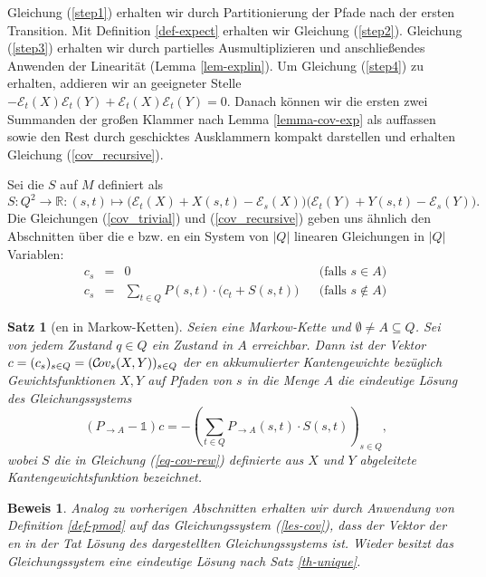 \documentclass[a4paper]{article}
\newcommand{\mc}{Markow-Kette}
\newtheorem{satz}{Satz}[section] %
\theoremstyle{nonumberplain}
\newtheorem{beweis}{Beweis}
\begin{document}
Gleichung (\ref{step1}) erhalten wir durch Partitionierung der Pfade nach der ersten Transition.
Mit Definition \ref{def-expect} erhalten wir Gleichung (\ref{step2}).
Gleichung (\ref{step3}) erhalten wir durch partielles Ausmultiplizieren und anschließendes Anwenden der Linearität (Lemma \ref{lem-explin}). Um Gleichung (\ref{step4}) zu erhalten, addieren wir an geeigneter Stelle $- \mathcal{E}_{t}(X)\mathcal{E}_{t}(Y) + \mathcal{E}_{t}(X)\mathcal{E}_{t}(Y) = 0$. Danach können wir die ersten zwei Summanden der großen Klammer nach Lemma \ref{lemma-cov-exp} als \cov{} auffassen sowie den Rest durch geschicktes Ausklammern kompakt darstellen und erhalten Gleichung (\ref{cov_recursive}).

Sei die \reward{} $S$ auf $M$ definiert als
\begin{equation}
S: Q^2 \to \mathbb{R} : (s,t) \mapsto \big(\mathcal{E}_{t}(X) + X(s,t) - \mathcal{E}_{s}(X)\big)\big(\mathcal{E}_{t}(Y) + Y(s,t) - \mathcal{E}_{s}(Y)\big)\text{.} \label{eq-cov-rew}
\end{equation}
Die Gleichungen (\ref{cov_trivial}) und (\ref{cov_recursive}) geben uns ähnlich den Abschnitten über die \expect{}e bzw. \cov{}en ein System von $|Q|$ linearen Gleichungen in $|Q|$ Variablen:
\begin{equation}
\begin{aligned}
c_s & = & 0 && \text{(falls $s \in A$)}\\
c_s & = & \sum_{t \in Q}P(s,t) \cdot \big(c_t + S(s,t)\big) && \text{(falls $s \notin A$)} 
\end{aligned} \label{les-cov}
\end{equation}
\begin{satz}[\cov{}en in \mc{}n] \label{th-cov}
	\quad Seien \mcex{} eine \mc{} und $\emptyset \neq A\subseteq Q$. Sei von jedem Zustand $q\in Q$ ein Zustand in $A$ erreichbar. Dann ist der Vektor $c = (c_s)_{s \in Q } = (\mathcal{C}\!ov_{s}(X,Y))_{s \in Q }$ der \cov{}en akkumulierter Kantengewichte bezüglich Gewichtsfunktionen $X,Y$ auf Pfaden von $s$ in die Menge $A$ die eindeutige Lösung des Gleichungssystems
	\begin{equation}
	(P_{\rightarrow A} - \mathbb{1}) c = - \left(\sum_{t \in Q}{ P_{\rightarrow A}(s,t) \cdot S(s,t) }\right)_{s \in Q} \text{,}\label{les-cov-mat}
	\end{equation}
	wobei $S$ die in Gleichung (\ref{eq-cov-rew}) definierte aus $X$ und $Y$ abgeleitete Kantengewichtsfunktion bezeichnet.
\end{satz}
\begin{beweis}
	Analog zu vorherigen Abschnitten erhalten wir durch Anwendung von Definition \ref{def-pmod} auf das Gleichungssystem (\ref{les-cov}), dass der Vektor der \cov{}en in der Tat Lösung des dargestellten Gleichungssystems ist. Wieder besitzt das Gleichungssystem eine eindeutige Lösung nach Satz \ref{th-unique}.
\end{beweis}
\end{document}
